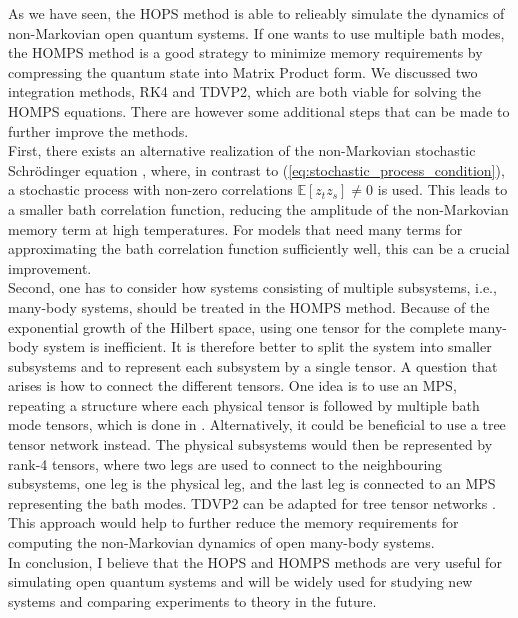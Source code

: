 As we have seen, the HOPS method is able to relieably simulate the dynamics of non-Markovian open quantum systems. 
If one wants to use multiple bath modes, the HOMPS method is a good strategy to minimize memory requirements by
compressing the quantum state into Matrix Product form. We discussed two integration methods, RK4 and TDVP2, which are
both viable for solving the HOMPS equations. There are however some additional steps that can be made to further
improve the methods. \\
First, there exists an alternative realization of the non-Markovian stochastic Schrödinger equation \cite{Song:2016},
where, in contrast to (\ref{eq:stochastic_process_condition}), a stochastic process with non-zero correlations 
$\mathbb{E}\left[z_{t}z_{s}\right]\neq0$ is used. This leads to a smaller bath correlation function, reducing the
amplitude of the non-Markovian memory term at high temperatures. For models that need many terms for approximating the 
bath correlation function sufficiently well, this can be a crucial improvement.\\
Second, one has to consider how systems consisting of multiple subsystems, i.e., many-body systems, should be treated in the HOMPS method. Because of the
exponential growth of the Hilbert space, using one tensor for the complete many-body system is inefficient. It is therefore
better to split the system into smaller subsystems and to represent each subsystem by a single tensor. A question that arises
is how to connect the different tensors. One idea is to use an MPS, repeating a structure where each physical tensor is followed
by multiple bath mode tensors, which is done in \cite{Gao:2022}. Alternatively, it could be beneficial to use a tree tensor network \cite{Holzner:2010}
instead. The physical subsystems would then be represented by rank-4 tensors, where two legs are used to connect to the neighbouring subsystems,
one leg is the physical leg, and the last leg is connected to an MPS representing the bath modes.
TDVP2 can be adapted for tree tensor networks \cite{Holzner:2010}. This approach would help to further reduce the
memory requirements for computing the non-Markovian dynamics of open many-body systems.\\
In conclusion, I believe that the HOPS and HOMPS methods are very useful for simulating open quantum systems and will be widely used
for studying new systems and comparing experiments to theory in the future.